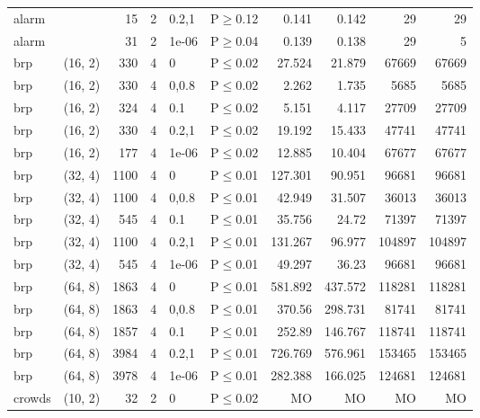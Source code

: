 \begin{longtable}{llrrllrrrr}
 alarm         &          &     	15 &   2 & 0.2,1 & P$\geq$0.12  & 0.141   & 0.142   & 29      & 29     \\
 alarm         &          &     	31 &   2 & 1e-06 & P$\geq$0.04  & 0.139   & 0.138   & 29      & 5      \\
 brp           & (16, 2)  &    	330 &   4 & 0     & P$\leq$0.02  & 27.524  & 21.879  & 67669   & 67669  \\
 brp           & (16, 2)  &    	330 &   4 & 0,0.8 & P$\leq$0.02  & 2.262   & 1.735   & 5685    & 5685   \\
 brp           & (16, 2)  &    	324 &   4 & 0.1   & P$\leq$0.02  & 5.151   & 4.117   & 27709   & 27709  \\
 brp           & (16, 2)  &    	330 &   4 & 0.2,1 & P$\leq$0.02  & 19.192  & 15.433  & 47741   & 47741  \\
 brp           & (16, 2)  &    	177 &   4 & 1e-06 & P$\leq$0.02  & 12.885  & 10.404  & 67677   & 67677  \\
 brp           & (32, 4)  &   	1100 &   4 & 0     & P$\leq$0.01  & 127.301 & 90.951  & 96681   & 96681  \\
 brp           & (32, 4)  &   	1100 &   4 & 0,0.8 & P$\leq$0.01  & 42.949  & 31.507  & 36013   & 36013  \\
 brp           & (32, 4)  &    	545 &   4 & 0.1   & P$\leq$0.01  & 35.756  & 24.72   & 71397   & 71397  \\
 brp           & (32, 4)  &   	1100 &   4 & 0.2,1 & P$\leq$0.01  & 131.267 & 96.977  & 104897  & 104897 \\
 brp           & (32, 4)  &    	545 &   4 & 1e-06 & P$\leq$0.01  & 49.297  & 36.23   & 96681   & 96681  \\
 brp           & (64, 8)  &   	1863 &   4 & 0     & P$\leq$0.01  & 581.892 & 437.572 & 118281  & 118281 \\
 brp           & (64, 8)  &   	1863 &   4 & 0,0.8 & P$\leq$0.01  & 370.56  & 298.731 & 81741   & 81741  \\
 brp           & (64, 8)  &   	1857 &   4 & 0.1   & P$\leq$0.01  & 252.89  & 146.767 & 118741  & 118741 \\
 brp           & (64, 8)  &   	3984 &   4 & 0.2,1 & P$\leq$0.01  & 726.769 & 576.961 & 153465  & 153465 \\
 brp           & (64, 8)  &   	3978 &   4 & 1e-06 & P$\leq$0.01  & 282.388 & 166.025 & 124681  & 124681 \\
 crowds        & (10, 2)  &     	32 &   2 & 0     & P$\leq$0.02  & MO      & MO      & MO      & MO     \\

\end{longtable}
